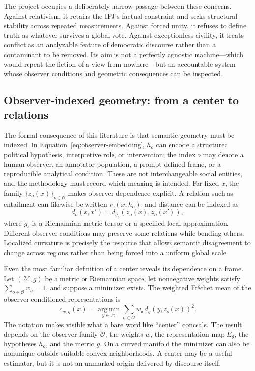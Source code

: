 The project occupies a deliberately narrow passage between these concerns. Against relativism, it retains the IFJ's factual constraint and seeks structural stability across repeated measurements. Against forced unity, it refuses to define truth as whatever survives a global vote. Against exceptionless civility, it treats conflict as an analyzable feature of democratic discourse rather than a contaminant to be removed. Its aim is not a perfectly agnostic machine---which would repeat the fiction of a view from nowhere---but an accountable system whose observer conditions and geometric consequences can be inspected.

\subsection{Observer-indexed geometry: from a center to relations}

The formal consequence of this literature is that semantic geometry must be indexed. In Equation~\eqref{eq:observer-embedding}, \(h_o\) can encode a structured political hypothesis, interpretive role, or intervention; the index \(o\) may denote a human observer, an annotator population, a prompt-defined frame, or a reproducible analytical condition. These are not interchangeable social entities, and the methodology must record which meaning is intended. For fixed \(x\), the family \(\{z_o(x)\}_{o\in\mathcal{O}}\) makes observer dependence explicit. A relation such as entailment can likewise be written \(r_o(x,h_o)\), and distance can be indexed as
\begin{equation}
    d_o(x,x')=d_{g_o}\!\left(z_o(x),z_o(x')\right),
    \label{eq:observer-distance}
\end{equation}
where \(g_o\) is a Riemannian metric tensor or a specified local approximation. Different observer conditions may preserve some relations while bending others. Localized curvature is precisely the resource that allows semantic disagreement to change across regions rather than being forced into a uniform global scale.

Even the most familiar definition of a center reveals its dependence on a frame. Let \((\mathcal{M},g)\) be a metric or Riemannian space, let nonnegative weights satisfy \(\sum_{o\in\mathcal{O}}w_o=1\), and suppose a minimizer exists. The weighted Fr\'echet mean of the observer-conditioned representations is
\begin{equation}
    c_{w,g}(x)
    =\operatorname*{arg\,min}_{y\in\mathcal{M}}
      \sum_{o\in\mathcal{O}}w_o\,
      d_g\!\left(y,z_o(x)\right)^2.
    \label{eq:frechet-mean}
\end{equation}
The notation makes visible what a bare word like ``center'' conceals. The result depends on the observer family \(\mathcal{O}\), the weights \(w\), the representation map \(E_\theta\), the hypotheses \(h_o\), and the metric \(g\). On a curved manifold the minimizer can also be nonunique outside suitable convex neighborhoods. A center may be a useful estimator, but it is not an unmarked origin delivered by discourse itself.

